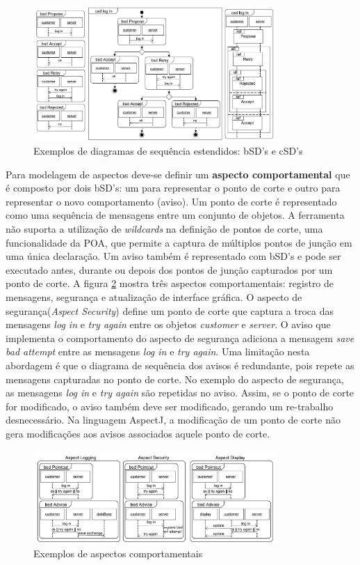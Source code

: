 \begin{figure}
	\centering
	\includegraphics[width=350px]{img/klein_sequence_diagrams.png}
	\caption{Exemplos de diagramas de sequência
	estendidos: bSD's e cSD's}\label{fig:klein_sequence_diagrams}
\end{figure}

Para modelagem de aspectos deve-se definir um \textbf{aspecto comportamental} que é composto por dois bSD's: um para representar o ponto de corte e
outro para representar o novo comportamento (aviso). Um ponto de corte é representado como uma sequência de mensagens entre um conjunto de objetos. A
ferramenta não suporta a utilização de \textit{wildcards} na definição de pontos de corte, uma funcionalidade da POA, que permite a captura
de múltiplos pontos de junção em uma única declaração. Um aviso também é representado com bSD's e pode ser executado antes, durante ou depois dos
pontos de junção capturados por um ponto de corte. A figura \ref{fig:klein_aspects} mostra três aspectos comportamentais: registro de mensagens,
segurança e atualização de interface gráfica. O aspecto de segurança(\textit{Aspect Security}) define um ponto de corte que captura a troca das
mensagens \textit{log in} e \textit{try again} entre os objetos \textit{customer} e \textit{server}. O aviso que implementa o comportamento do aspecto
de segurança adiciona a mensagem \textit{save bad attempt} entre as mensagens \textit{log in} e \textit{try again}. Uma limitação nesta abordagem é
que o diagrama de sequência dos avisos é redundante, pois repete as mensagens capturadas no ponto de corte. No exemplo do aspecto de segurança, as
mensagens \textit{log in} e \textit{try again} são repetidas no aviso. Assim, se o ponto de corte for modificado, o aviso também deve ser modificado,
gerando um re-trabalho desnecessário. Na linguagem AspectJ, a modificação de um ponto de corte não gera modificações aos avisos associados aquele
ponto de corte.

\begin{figure}
	\centering
	\includegraphics[width=350px]{img/klein_aspects.png}
	\caption{Exemplos de aspectos comportamentais}\label{fig:klein_aspects}
\end{figure}

